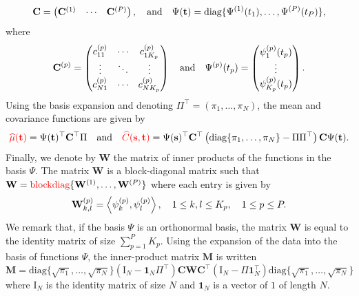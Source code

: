 \begin{equation}
    \mathbf{C} = \begin{pmatrix}
            \mathbf{C}^{(1)} & \cdots & \mathbf{C}^{(P)} \\
        \end{pmatrix}, \quad \text{and}\quad
    \Psi(\mathbf{t}) = \text{diag}\{\Psi^{(1)}(t_1), \dots, \Psi^{(P)}(t_P)\},
\end{equation}
where
\begin{equation}
\mathbf{C}^{(p)} = \begin{pmatrix}
    c^{(p)}_{11} & \cdots & c^{(p)}_{1K_p} \\
    \vdots & \ddots & \vdots \\
    c^{(p)}_{N1} & \cdots & c^{(p)}_{NK_p}
\end{pmatrix} \\
\quad \text{and}\quad
\Psi^{(p)}(t_p) = \begin{pmatrix}
    \psi_1^{(p)}(t_p) \\
    \vdots \\
    \psi_{K_p}^{(p)}(t_p)
\end{pmatrix}.
\end{equation}
Using the basis expansion and denoting $\Pi^\top = (\pi_1, \dots, \pi_N)$, the mean and covariance functions are given by
\begin{equation}
    \textcolor{red}{\widehat{\mu}(\mathbf{t})} = \Psi(\mathbf{t})^\top \mathbf{C}^\top\Pi \quad\text{and}\quad \textcolor{red}{\widehat{C}(\mathbf{s}, \mathbf{t})} = \Psi(\mathbf{s})^\top \mathbf{C}^\top \left(\text{diag}\{
        \pi_1, \dots, \pi_N\} - \Pi\Pi^\top\right)\mathbf{C} \Psi(\mathbf{t}).
\end{equation}
Finally, we denote by $\mathbf{W}$ the matrix of inner products of the functions in the basis $\Psi$. The matrix $\mathbf{W}$ is a block-diagonal matrix such that $\mathbf{W} = \textcolor{red}{\text{blockdiag}}\{\mathbf{W}^{(1)}, \dots, \mathbf{W}^{(P)}\}$ where each entry is given by
\begin{equation}
    \mathbf{W}_{k, l}^{(p)} = \left\langle\psi_k^{(p)}, \psi_l^{(p)}\right\rangle, \quad 1 \leq k, l \leq K_p, \quad 1 \leq p \leq P.
\end{equation}
We remark that, if the basis $\Psi$ is an orthonormal basis, the matrix $\mathbf{W}$ is equal to the identity matrix of size $\sum_{p = 1}^P K_p$.
Using the expansion of the data into the basis of functions $\Psi$, the inner-product matrix $\mathbf{M}$ is written 
\begin{equation}\label{eq:gram_matrix_basis}
    \mathbf{M} = \text{diag}\{
        \sqrt{\pi_1}, \dots, \sqrt{\pi_N}\}\left(\mathrm{I}_{\!N} - \mathbf{1}_{\!N}\Pi^\top\right) \mathbf{C} \mathbf{W} \mathbf{C}^\top \left(\mathrm{I}_{\!N} - \Pi\mathbf{1}_{\!N}^\top\right)\text{diag}\{
        \sqrt{\pi_1}, \dots, \sqrt{\pi_N}\}
\end{equation}
where $\mathrm{I}_{\!N}$ is the identity matrix of size $N$ and $\mathbf{1}_{\!N}$ is a vector of $1$ of length $N$.


